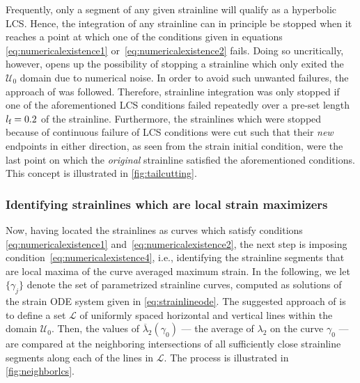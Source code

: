 Frequently, only a segment of any given strainline will qualify as a hyperbolic
LCS\@. Hence, the integration of any strainline can in principle be stopped
when it reaches a point at which one of the conditions given in equations
\eqref{eq:numericalexistence1} or~\eqref{eq:numericalexistence2} fails. Doing so
uncritically, however, opens up the possibility of stopping a strainline which
only exited the $\mathcal{U}_{0}$ domain due to numerical noise. In order to
avoid such unwanted failures, the approach of \textcite{farazmand2012computing}
was followed. Therefore, strainline integration was only stopped if one of the
aforementioned LCS conditions failed repeatedly over a pre-set length
$l_{\textnormal{f}}=0.2$ of the strainline. Furthermore, the strainlines which
were stopped because of continuous failure of LCS conditions were cut such that
their \emph{new} endpoints in either direction, as seen from the strain initial
condition, were the last point on which the \emph{original} strainline
satisfied the aforementioned conditions. This concept is illustrated in
\cref{fig:tailcutting}.



\clearpage
\subsubsection{Identifying strainlines which are local strain maximizers}
\label{ssub:identifying_strainlines_which_are_local_strain_maximizers}

Now, having located the strainlines as curves which satisfy conditions
\eqref{eq:numericalexistence1} and~\eqref{eq:numericalexistence2}, the next
step is imposing condition~\eqref{eq:numericalexistence4}, i.e., identifying the
strainline segments that are local maxima of the curve averaged maximum strain.
In the following, we let $\{\gamma_{j}\}$ denote the set of parametrized
strainline curves, computed as solutions of the strain ODE system given in
\cref{eq:strainlineode}. The suggested approach of
\textcite{farazmand2012computing} is to define a set $\mathcal{L}$ of uniformly
spaced horizontal and vertical lines within the domain $\mathcal{U}_{0}$. Then,
the values of $\overline{\lambda}_{2}(\gamma_{0})$ --- the average of
$\lambda_{2}$ on the curve $\gamma_{0}$ --- are compared at the neighboring
intersections of all sufficiently close strainline segments along each of the
lines in $\mathcal{L}$. The process is illustrated in
\cref{fig:neighborlcs}.

